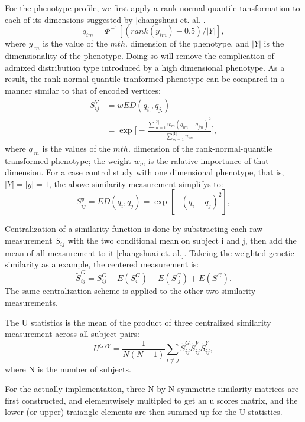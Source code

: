 For the phenotype profile, we first apply a rank normal quantile tansformation to each of its dimensions suggested by [changshuai et. al.]. 
\begin{displaymath}
  q_{im}=\Phi^{-1}[(rank(y_{im})-0.5)/|Y|],
\end{displaymath} 
where $y_{.m}$ is the value of the $m th.$ dimension of the phenotype, and $|Y|$ is the dimensionality of the phenotype. Doing so will remove the complication of admixed distribution type introduced by a high dimensional phenotype. As a result, the rank-normal-quantile tranformed phenotype can be compared in a manner similar to that of encoded vertices:
\begin{equation} \label{eq_wSY}
\begin{split}
  S_{ij}^Y &= wED(q_{i.},q_{j.}) \\
  &=\exp
  {
    \Big[-\frac{\sum_{m=1}^{|Y|}{w_m(q_{im}-q_{jm})^2}} {\sum_{m=1}^{|Y|}{w_m}}\Big]
  },
\end{split}
\end{equation}
where $q_{.m}$ is the values of the $m th.$ dimension of the rank-normal-quantile transformed phenotype; the weight $w_m$ is the ralative importance of that dimension. For a case control study with one dimensional phenotype, that is, $|Y|=|y|=1$, the above similarity measurement simplifys to:
\begin{displaymath}
  S_{ij}^{y}=ED(q_i,q_j)=\exp{[-(q_i-q_j)^2]},
\end{displaymath}

Centralization of a similarity function is done by substracting each raw measurement $S_{ij}$ with the two conditional mean on subject i and j, then add the mean of all measurement to it [changshuai et. al.]. Takeing the weighted genetic similarity as a example, the centered measurement is:
\begin{displaymath}
  \tilde{S}_{ij}^{G}=S_{ij}^{G}-E(S_{i.}^{G})-E(S_{.j}^{G})+E(S_{..}^{G}).
\end{displaymath}
The same centralization scheme is applied to the other two similarity measurements.

The U statistics is the mean of the product of three centralized similarity measurement across all subject pairs:
\begin{displaymath}
  U^{GVY}=\frac{1}{N(N-1)}\sum_{i \neq j} \tilde{S}_{ij}^{G} \tilde{S}_{ij}^{V} \tilde{S}_{ij}^{Y},
\end{displaymath}
where N is the number of subjects.

For the actually implementation, three N by N symmetric similarity matrices are first constructed, and elementwisely multipled to get an u scores matrix, and the lower (or upper) traiangle elements are then summed up for the U statistics.

